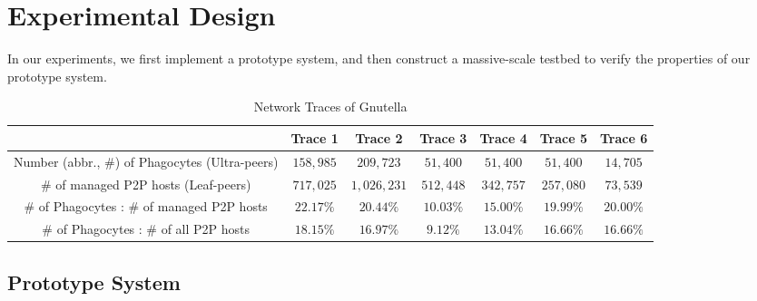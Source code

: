 \documentclass[times,10pt,twocolumn]{article}
\begin{document}
\section{Experimental Design}
\label{sec:ExDesign}

In our experiments, we first implement a prototype system, and then
construct a massive-scale testbed to verify the properties of our
prototype system.

\begin{table*}[tbp]
    \centering
    \caption{Network Traces of Gnutella}
    \label{tab:trace}
    \footnotesize{
    \begin{tabular}{|c|c|c|c|c|c|c|}
        \hline
                                                       & Trace 1    & Trace 2     & Trace 3    & Trace 4    & Trace 5    & Trace 6   \\
        \hline
        Number (abbr., \#) of Phagocytes (Ultra-peers) & $158,985$  & $209,723$   & $51,400$   & $51,400$   & $51,400$   & $14,705$  \\
        \hline
        \# of managed P2P hosts (Leaf-peers)           & $717,025$  & $1,026,231$ & $512,448$  & $342,757$  & $257,080$  & $73,539$  \\
        \hline
        \# of Phagocytes : \# of managed P2P hosts     & $22.17\%$  & $20.44\%$   & $10.03\%$  & $15.00\%$  & $19.99\%$  & $20.00\%$ \\
        \hline
        \# of Phagocytes : \# of all P2P hosts         & $18.15\%$  & $16.97\%$   & $9.12\%$   & $13.04\%$  & $16.66\%$  & $16.66\%$ \\
        \hline
    \end{tabular}}
\end{table*}


\subsection{Prototype System}
\label{subsec:internal_prototype}
\end{document}

